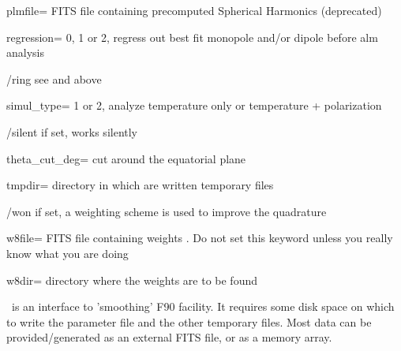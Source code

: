 \begin{keywords}
\begin{kwlist}{}
\item[plmfile=]  FITS file containing precomputed Spherical Harmonics (deprecated) 

\item[regression=]  0, 1 or 2, regress out best fit monopole and/or dipole before
    alm analysis

\item[/ring]  see 
 and 
 above

\item[simul\_type=]  1 or 2, analyze temperature only or temperature + polarization

\item[/silent]     if set, works silently

\item[theta\_cut\_deg=]  cut around the equatorial plane 

\item[tmpdir=]       directory in which are written temporary files 

\item[/won]      if set, a weighting scheme is used to improve the quadrature

\item[w8file=]     FITS file containing weights 
     .
   Do not set this keyword unless you really know what you are doing

\item[w8dir=]      directory where the weights are to be found 

  \end{kwlist}
\end{keywords}  

\begin{codedescription}
{\thedocid\ is an interface to 'smoothing' F90 facility. It
requires some disk space on which to write the parameter file and the other
temporary files. Most data can be provided/generated as an external FITS
file, or as a memory array.}
\end{codedescription}



